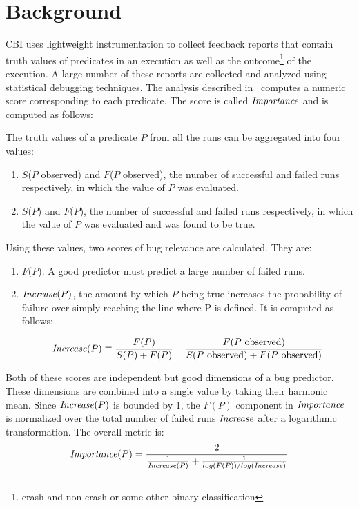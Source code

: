 
\section{Background}
\label{sec-bground}
CBI uses lightweight instrumentation to collect feedback reports that contain truth values of predicates in an execution as well as the outcome{\footnote{crash and non-crash or some other binary classification}} of the execution.  A large number of these reports are collected and analyzed using statistical debugging techniques.  The analysis described in~\cite{Liblit:2005:SSBI} computes a numeric score corresponding to each predicate.  The score is called $\mathit{Importance}$ and is computed as follows:

The truth values of a predicate $P$ from all the runs can be aggregated into four values:

\begin{enumerate}
\item $S$($P$ observed) and $F$($P$ observed), the number of successful and failed runs respectively, in which the value of $P$ was evaluated.
\item $S$($P$) and $F$($P$), the number of successful and failed runs respectively, in which the value of $P$ was evaluated and was found to be true.
\end{enumerate}

Using these values, two scores of bug relevance are calculated.  They are:
\begin{enumerate}
\item $F$($P$).  A good predictor must predict a large number of failed runs.
\item $\mathit{Increase}(P)$, the amount by which $P$ being true increases the probability of failure over simply reaching the line where P is defined.  It is computed as follows:

\begin{equation}
\label{eqn1}
\mathit{Increase}(P) \equiv 
\frac{F(P)}{S(P) + F(P)}
-
\frac{F(\text{$P$ observed})}{S(\text{$P$ observed}) +
  F(\text{$P$ observed})}
\end{equation}
\end{enumerate}

Both of these scores are independent but good dimensions of a bug predictor.  These dimensions are combined into a single value by taking their harmonic mean.  Since $\mathit{Increase}(P)$ is bounded by 1, the $F(P)$ component in $\mathit{Importance}$ is normalized over the total number of failed runs $\mathit{Increase}$ after a logarithmic transformation.  The overall metric is:
\begin{equation}
\label{eqn2}
\mathit{Importance}(P) =
\frac{2}{
  \frac{1}{\mathit{Increase}(P)}
  +
  \frac{1}{log(F(P)) / log(\mathit{Increase})}}
\end{equation}

